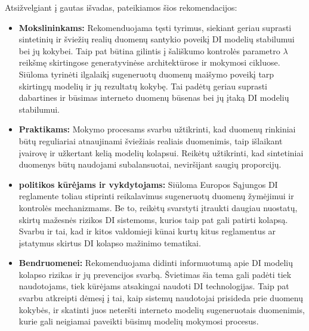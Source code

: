 \documentclass{VUMIFInfKursinis}
\begin{document}
Atsižvelgiant į gautas išvadas, pateikiamos šios rekomendacijos:
\begin{itemize}
    \item \textbf{Mokslininkams:} Rekomenduojama tęsti tyrimus, siekiant geriau suprasti sintetinių ir šviežių realių duomenų santykio poveikį DI modelių stabilumui bei jų kokybei. Taip pat būtina gilintis į šališkumo kontrolės parametro \(\lambda\) reikšmę skirtingose generatyvinėse architektūrose ir mokymosi cikluose. Siūloma tyrinėti ilgalaikį sugeneruotų duomenų maišymo poveikį tarp skirtingų modelių ir jų rezultatų kokybę. Tai padėtų geriau suprasti dabartines ir būsimas interneto duomenų būsenas bei jų įtaką DI modelių stabilumui.
    \item \textbf{Praktikams:} Mokymo procesams svarbu užtikrinti, kad duomenų rinkiniai būtų reguliariai atnaujinami šviežiais realiais duomenimis, taip išlaikant įvairovę ir užkertant kelią modelių kolapsui. Reikėtų užtikrinti, kad sintetiniai duomenys būtų naudojami subalansuotai, neviršijant saugių proporcijų.
    \item \textbf{politikos kūrėjams ir vykdytojams:} Siūloma Europos Sąjungos DI reglamente toliau stiprinti reikalavimus sugeneruotų duomenų žymėjimui ir kontrolės mechanizmams. Be to, reikėtų svarstyti įtraukti daugiau nuostatų, skirtų mažesnės rizikos DI sistemoms, kurios taip pat gali patirti kolapsą. Svarbu ir tai, kad ir kitos valdomieji kūnai kurtų kitus reglamentus ar įstatymus skirtus DI kolapso mažinimo tematikai. 
    \item \textbf{Bendruomenei:} Rekomenduojama didinti informuotumą apie DI modelių kolapso rizikas ir jų prevencijos svarbą. Švietimas šia tema gali padėti tiek naudotojams, tiek kūrėjams atsakingai naudoti DI technologijas. Taip pat svarbu atkreipti dėmesį į tai, kaip sistemų naudotojai prisideda prie duomenų kokybės, ir skatinti juos neteršti interneto modelių sugeneruotais duomenimis, kurie gali neigiamai paveikti būsimų modelių mokymosi procesus.

\end{itemize}



\printbibliography[heading=bibintoc] %
\end{document}
